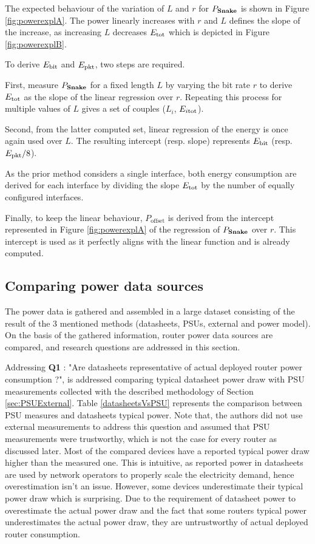 The expected behaviour of the variation of $L$ and $r$ for $P_{\textnormal{\textbf{Snake}}}$ is shown in Figure \ref{fig:powerexplA}.
The power linearly increases with $r$ and $L$ defines the slope of the increase, as increasing $L$ decreases $E_\textnormal{tot}$ which is depicted in Figure \ref{fig:powerexplB}. 

To derive $E_\textnormal{bit}$ and $E_\textnormal{pkt}$, two steps are required.

First, measure $P_\textnormal{\textbf{Snake}}$ for a fixed length $L$ by varying the bit rate $r$ to derive $E_\textnormal{tot}$ as the slope of the linear regression over $r$.
Repeating this process for multiple values of $L$ gives a set of couples ($L_i$, $E_{i\textnormal{tot}}$).

Second, from the latter computed set, linear regression of the energy is once again used over $L$.
The resulting intercept (resp. slope) represents $E_\textnormal{bit}$ (resp. $E_\textnormal{pkt} / 8$).

As the prior method considers a single interface, both energy consumption are derived for each interface by dividing the slope $E_\textnormal{tot}$ by the number of equally configured interfaces.   

Finally, to keep the linear behaviour, $P_\text{offset}$ is derived from the intercept represented in Figure \ref{fig:powerexplA} of the regression of $P_\text{\textbf{Snake}}$ over $r$.
This intercept is used as it perfectly aligns with the linear function and is already computed. 

\subsection{Comparing power data sources}\label{sec:comparison} 
The power data is gathered and assembled in a large dataset\cite{NetPowZoo} consisting of the result of the 3 mentioned methods (datasheets, PSUs, external and power model).
On the basis of the gathered information, router power data sources are compared, and research questions are addressed in this section.

Addressing \textbf{Q1} : "Are datasheets representative of actual deployed router power consumption ?", is addressed comparing typical datasheet power draw with PSU measurements collected with the described methodology of Section \ref{sec:PSUExternal}.
Table \ref{datasheetsVsPSU} represents the comparison between PSU measures and datasheets typical power.
Note that, the authors did not use external measurements to address this question and assumed that PSU measurements were trustworthy, which is not the case for every router as discussed later.       
Most of the compared devices have a reported typical power draw higher than the measured one.
This is intuitive, as reported power in datasheets are used by network operators to properly scale the electricity demand, hence overestimation isn't an issue. 
However, some devices underestimate their typical power draw which is surprising.   
Due to the requirement of datasheet power to overestimate the actual power draw and the fact that some routers typical power underestimates the actual power draw, they are untrustworthy of actual deployed router consumption. 

